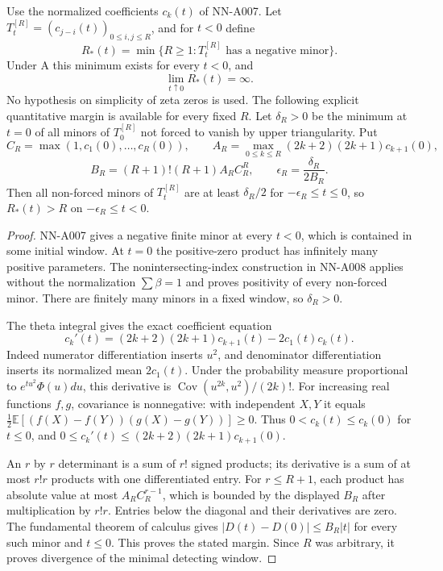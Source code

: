 \begin{theorem}
Use the normalized coefficients $c_k(t)$ of NN-A007. Let
$T_t^{[R]}=(c_{j-i}(t))_{0\le i,j\le R}$, and for $t<0$ define
\[
 R_*(t)=\min\{R\ge1:T_t^{[R]}\text{ has a negative minor}\}.
\]
Under A this minimum exists for every $t<0$, and
\[
 \lim_{t\uparrow0}R_*(t)=\infty.
\]
No hypothesis on simplicity of zeta zeros is used. The following
explicit quantitative margin is available for every fixed $R$.
Let $\delta_R>0$ be the minimum at $t=0$ of all minors of
$T_0^{[R]}$ not forced to vanish by upper triangularity. Put
\[
 C_R=\max(1,c_1(0),\ldots,c_R(0)),\qquad
 A_R=\max_{0\le k\le R}(2k+2)(2k+1)c_{k+1}(0),
\]
\[
 B_R=(R+1)!(R+1)A_RC_R^R,\qquad
 \epsilon_R=\frac{\delta_R}{2B_R}.
\]
Then all non-forced minors of $T_t^{[R]}$ are at least
$\delta_R/2$ for $-\epsilon_R\le t\le0$, so
$R_*(t)>R$ on $-\epsilon_R\le t<0$.
\end{theorem}
\begin{proof}
NN-A007 gives a negative finite minor at every $t<0$, which is
contained in some initial window. At $t=0$ the positive-zero product
has infinitely many positive parameters. The nonintersecting-index
construction in NN-A008 applies without the normalization $\sum\beta=1$
and proves positivity of every non-forced minor. There are finitely
many minors in a fixed window, so $\delta_R>0$.

The theta integral gives the exact coefficient equation
\[
 c_k'(t)=(2k+2)(2k+1)c_{k+1}(t)-2c_1(t)c_k(t).
\]
Indeed numerator differentiation inserts $u^2$, and denominator
differentiation inserts its normalized mean $2c_1(t)$.
Under the probability measure proportional to
$e^{tu^2}\Phi(u)du$, this derivative is
$\operatorname{Cov}(u^{2k},u^2)/(2k)!$.
For increasing real functions $f,g$, covariance is nonnegative:
with independent $X,Y$ it equals
$\frac12\mathbb E[(f(X)-f(Y))(g(X)-g(Y))]\ge0$.
Thus $0<c_k(t)\le c_k(0)$ for $t\le0$, and
$0\le c_k'(t)\le(2k+2)(2k+1)c_{k+1}(0)$.

An $r$ by $r$ determinant is a sum of $r!$ signed products; its
derivative is a sum of at most $r!r$ products with one differentiated
entry. For $r\le R+1$, each product has absolute value at most
$A_RC_R^{r-1}$, which is bounded by the displayed $B_R$ after
multiplication by $r!r$. Entries below the diagonal and their
derivatives are zero. The fundamental theorem of calculus gives
$|D(t)-D(0)|\le B_R|t|$ for every such minor and $t\le0$.
This proves the stated margin. Since $R$ was arbitrary, it proves
divergence of the minimal detecting window.
\end{proof}

